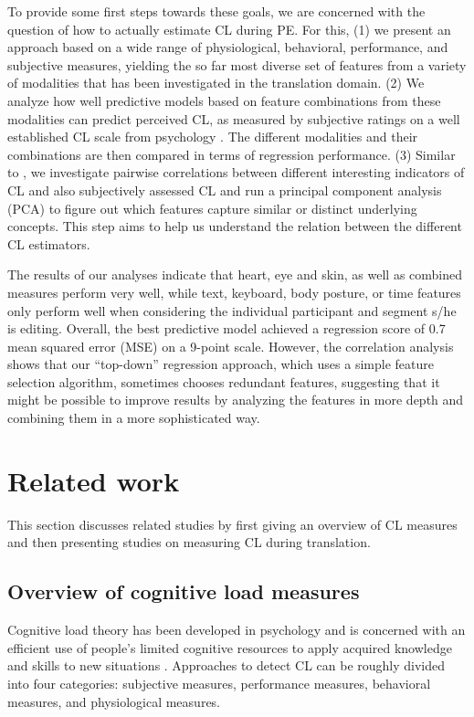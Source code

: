 \documentclass[output=paper]{langsci/langscibook}
\begin{document}
To provide some first steps towards these goals, we are concerned with the question of how to actually estimate CL during PE. For this,
(1) we present an approach based on a wide range of physiological, behavioral, performance, and subjective measures, yielding the so far most diverse set of features from a variety of modalities that has been investigated in the translation domain.
(2) We analyze how well predictive models based on feature combinations from these modalities can predict perceived CL, as measured by subjective ratings on a well established CL scale from psychology \citep{paas1994instructional}. The different modalities and their combinations are then compared in terms of regression performance.
(3) Similar to \citet{vieira2016measures}, we investigate pairwise correlations between different interesting indicators of CL and also subjectively assessed CL and run a principal component analysis (PCA) to figure out which features capture similar or distinct underlying concepts. This step aims to help us understand the relation between the different CL estimators.

The results of our analyses indicate that heart, eye and skin, as well as combined measures perform very well, while text, keyboard, body posture, or time features only perform well when considering the individual participant and segment s/he is editing. Overall, the best predictive model achieved a regression score of 0.7 mean squared error (MSE) on a 9-point scale. However, the correlation analysis shows that our ``top-down'' regression approach, which uses a simple feature selection algorithm, sometimes chooses redundant features, suggesting that it might be possible to improve results by analyzing the features in more depth and combining them in a more sophisticated way.

\section{Related work}
This section discusses related studies by first giving an overview of CL measures and then presenting studies on %
measuring CL during translation.

\subsection{Overview of cognitive load measures}
Cognitive load theory \citep{paas1994instructional, sweller1998cognitive} has been developed in psychology and is concerned with an efficient use of people's limited cognitive resources to apply acquired knowledge and skills to new situations \citep{paas2003cognitive}. Approaches to detect CL can be roughly divided into four categories: subjective measures, performance measures, behavioral measures, and physiological measures.
\end{document}
